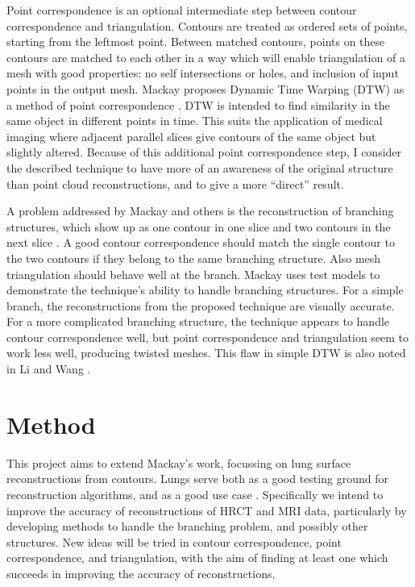\documentclass{IEEEtran}
\begin{document}
Point correspondence is an optional intermediate step between contour correspondence and triangulation. Contours are treated as ordered sets of points, starting from the leftmost point. Between matched contours, points on these contours are matched to each other in a way which will enable triangulation of a mesh with good properties: no self intersections or holes, and inclusion of input points in the output mesh. Mackay proposes Dynamic Time Warping (DTW) as a method of point correspondence \cite{mackay2019robust}. DTW is intended to find similarity in the same object in different points in time. This suits the application of medical imaging where adjacent parallel slices give contours of the same object but slightly altered. Because of this additional point correspondence step, I consider the described technique to have more of an awareness of the original structure than point cloud reconstructions, and to give a more “direct” result.

A problem addressed by Mackay and others is the reconstruction of branching structures, which show up as one contour in one slice and two contours in the next slice \cite{mackay2019robust, akkouche2004implicit}. A good contour correspondence should match the single contour to the two contours if they belong to the same branching structure. Also mesh triangulation should behave well at the branch. Mackay uses test models to demonstrate the technique’s ability to handle branching structures. For a simple branch, the reconstructions from the proposed technique are visually accurate. For a more complicated branching structure, the technique appears to handle contour correspondence well, but point correspondence and triangulation seem to work less well, producing twisted meshes. This flaw in simple DTW is also noted in Li and Wang \cite{li2021method}.

\section{Method}

This project aims to extend Mackay’s work, focussing on lung surface reconstructions from contours. Lungs serve both as a good testing ground for reconstruction algorithms, and as a good use case \cite{pluta2012new}. Specifically we intend to improve the accuracy of reconstructions of HRCT and MRI data, particularly by developing methods to handle the branching problem, and possibly other structures. New ideas will be tried in contour correspondence, point correspondence, and triangulation, with the aim of finding at least one which succeeds in improving the accuracy of reconstructions. 
\end{document}
